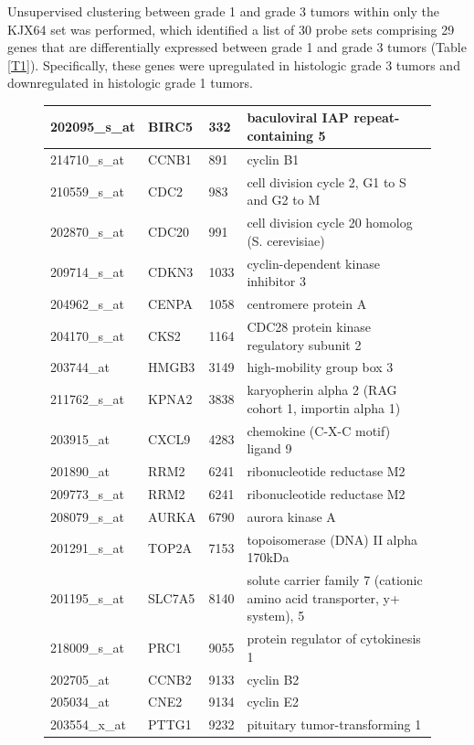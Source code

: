 \documentclass[a4paper,10pt]{article}
\begin{document}
Unsupervised clustering between grade 1 and grade 3 tumors within only the 
KJX64 set was performed, which identified a list of 30 probe sets comprising 
29 genes that are differentially expressed between grade 1 and grade 3 tumors 
(Table \ref{T1}).  Specifically, these genes were upregulated in histologic grade 3 tumors 
and downregulated in histologic grade 1 tumors.  


\begin{figure}
\begin{tabular}{| l | l | l | l | }
    \hline
202095\_s\_at & BIRC5 & 332 & baculoviral IAP repeat-containing 5\\ \hline 
214710\_s\_at & CCNB1 & 891 & cyclin B1\\ \hline 
210559\_s\_at & CDC2 & 983 & cell division cycle 2, G1 to S and G2 to M\\ \hline 
202870\_s\_at & CDC20 & 991 & cell division cycle 20 homolog (S. cerevisiae)\\ \hline 
209714\_s\_at & CDKN3 & 1033 & cyclin-dependent kinase inhibitor 3\\ \hline 
204962\_s\_at & CENPA & 1058 & centromere protein A\\ \hline 
204170\_s\_at & CKS2 & 1164 & CDC28 protein kinase regulatory subunit 2\\ \hline 
203744\_at & HMGB3 & 3149 & high-mobility group box 3\\ \hline 
211762\_s\_at & KPNA2 & 3838 & karyopherin alpha 2 (RAG cohort 1, importin alpha 1)\\ \hline 
203915\_at & CXCL9 & 4283 & chemokine (C-X-C motif) ligand 9\\ \hline 
201890\_at & RRM2 & 6241 & ribonucleotide reductase M2\\ \hline 
209773\_s\_at & RRM2 & 6241 & ribonucleotide reductase M2\\ \hline 
208079\_s\_at & AURKA & 6790 & aurora kinase A\\ \hline 
201291\_s\_at & TOP2A & 7153 & topoisomerase (DNA) II alpha 170kDa\\ \hline 
201195\_s\_at & SLC7A5 & 8140 & solute carrier family 7 (cationic amino acid transporter, y+ system), 5\\ \hline 
218009\_s\_at & PRC1 & 9055 & protein regulator of cytokinesis 1\\ \hline 
202705\_at & CCNB2 & 9133 & cyclin B2\\ \hline 
205034\_at & CNE2 & 9134 & cyclin E2\\ \hline 
203554\_x\_at & PTTG1 & 9232 & pituitary tumor-transforming 1\\ \hline 

\end{tabular}
\end{figure}
\end{document}
